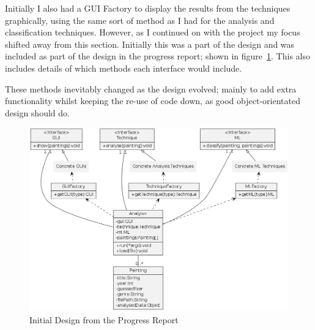Initially I also had a GUI Factory to display the results from the techniques graphically, using
the same sort of method as I had for the analysis and classification techniques. However, as I
continued on with the project my focus shifted away from this section. Initially this was a part
of the design and was included as part of the design in the progress report; shown in 
figure~\ref{fig:prog-design}. This also includes details of which methods each interface would 
include.

These methods inevitably changed as the design evolved; mainly to add extra functionality whilst
keeping the re-use of code down, as good object-orientated design should do.

\begin{figure}[h]
\includegraphics[width=\textwidth]{../ProgressReport/img/design.png}
\caption{Initial Design from the Progress Report}\label{fig:prog-design}
\end{figure}

